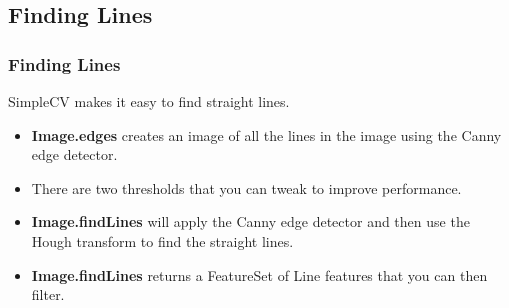 \documentclass[compress]{beamer}
\begin{document}
\subsection{Finding Lines}
\begin{frame}
  \frametitle{Finding Lines}
SimpleCV makes it easy to find straight lines.
\begin{itemize}
\item \textbf{Image.edges} creates an image of all the lines in the
  image using the Canny edge detector.
\item There are two thresholds that you can tweak to improve
  performance. 
\item \textbf{Image.findLines} will apply the Canny edge detector and
  then use the Hough transform to find the straight lines.
\item \textbf{Image.findLines} returns a FeatureSet of Line features
  that you can then filter.
\end{itemize}
\end{frame}
\end{document}

